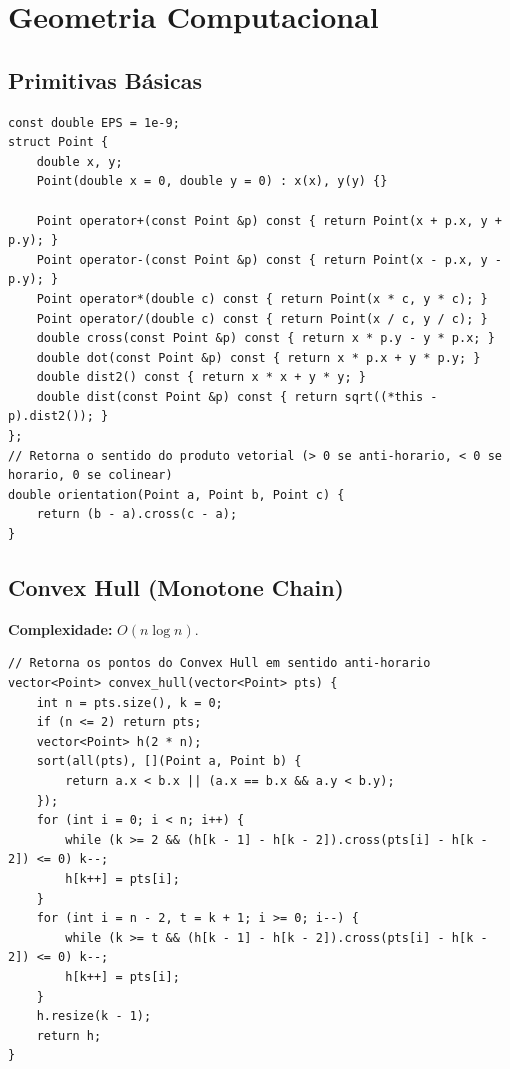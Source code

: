 \section{Geometria Computacional}



\subsection{Primitivas Básicas}

\begin{lstlisting}
const double EPS = 1e-9;
struct Point {
    double x, y;
    Point(double x = 0, double y = 0) : x(x), y(y) {}
    
    Point operator+(const Point &p) const { return Point(x + p.x, y + p.y); }
    Point operator-(const Point &p) const { return Point(x - p.x, y - p.y); }
    Point operator*(double c) const { return Point(x * c, y * c); }
    Point operator/(double c) const { return Point(x / c, y / c); }
    double cross(const Point &p) const { return x * p.y - y * p.x; }
    double dot(const Point &p) const { return x * p.x + y * p.y; }
    double dist2() const { return x * x + y * y; }
    double dist(const Point &p) const { return sqrt((*this - p).dist2()); }
};
// Retorna o sentido do produto vetorial (> 0 se anti-horario, < 0 se horario, 0 se colinear)
double orientation(Point a, Point b, Point c) {
    return (b - a).cross(c - a);
}
\end{lstlisting}

\subsection{Convex Hull (Monotone Chain)}

\textbf{Complexidade:} $O(n \log n)$.

\begin{lstlisting}
// Retorna os pontos do Convex Hull em sentido anti-horario
vector<Point> convex_hull(vector<Point> pts) {
    int n = pts.size(), k = 0;
    if (n <= 2) return pts;
    vector<Point> h(2 * n);
    sort(all(pts), [](Point a, Point b) {
        return a.x < b.x || (a.x == b.x && a.y < b.y);
    });
    for (int i = 0; i < n; i++) {
        while (k >= 2 && (h[k - 1] - h[k - 2]).cross(pts[i] - h[k - 2]) <= 0) k--;
        h[k++] = pts[i];
    }
    for (int i = n - 2, t = k + 1; i >= 0; i--) {
        while (k >= t && (h[k - 1] - h[k - 2]).cross(pts[i] - h[k - 2]) <= 0) k--;
        h[k++] = pts[i];
    }
    h.resize(k - 1);
    return h;
}
\end{lstlisting}


